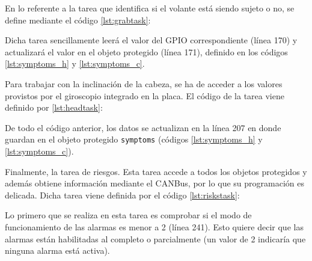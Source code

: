En lo referente a la tarea que identifica si el volante está siendo sujeto o no, se
define mediante el código \ref{lst:grabtask}:



Dicha tarea sencillamente leerá el valor del GPIO correspondiente (línea 170) y actualizará
el valor en el objeto protegido (línea 171), definido en los códigos \ref{lst:symptoms_h}
y \ref{lst:symptoms_c}.

Para trabajar con la inclinación de la cabeza, se ha de acceder a los valores provistos por
el giroscopio integrado en la placa. El código de la tarea viene definido por
\ref{lst:headtask}:



De todo el código anterior, los datos se actualizan en la línea 207 en donde guardan en
el objeto protegido \texttt{symptoms} (códigos \ref{lst:symptoms_h} y \ref{lst:symptoms_c}).

Finalmente, la tarea de riesgos. Esta tarea accede a todos los objetos protegidos y
además obtiene información mediante el CANBus, por lo que su programación es delicada.
Dicha tarea viene definida por el código \ref{lst:riskstask}:



Lo primero que se realiza en esta tarea es comprobar si el modo de funcionamiento de las
alarmas es menor a 2 (línea 241). Esto quiere decir que las alarmas están habilitadas al completo
o parcialmente (un valor de 2 indicaría que ninguna alarma está activa).

